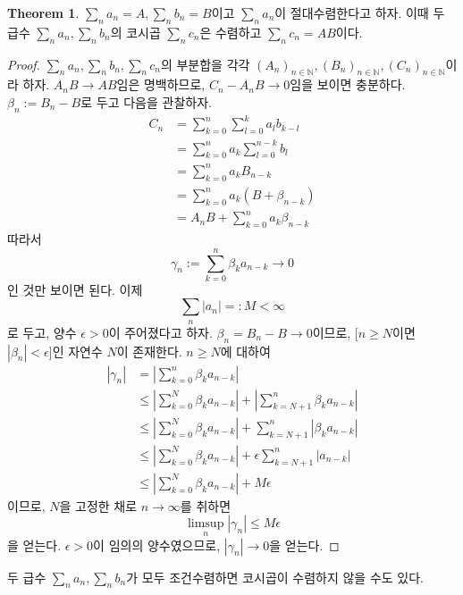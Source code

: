 \documentclass[11pt]{book}
\numberwithin{equation}{chapter}
\def\NN{\mathbb{N}}
\def\eps{\epsilon}
\newcommand{\abs}[1]{\left\vert#1\right\vert}
\theoremstyle{definition}
\newtheorem{thm}{Theorem}[section]
\begin{document}
\begin{thm} \label{5.9.2}
    \(\sum_n a_n = A, \sum_n b_n = B\)이고 \(\sum_n a_n\)이 절대수렴한다고 하자. 이때 두 급수 \(\sum_n a_n, \sum_n b_n\)의 코시곱 \(\sum_n c_n\)은 수렴하고 \(\sum_n c_n = AB\)이다.
\end{thm}
\begin{proof}
    \(\sum_n a_n, \sum_n b_n, \sum_n c_n\)의 부분합을 각각 \((A_n)_{n \in \NN}, (B_n)_{n \in \NN}, (C_n)_{n \in \NN}\)이라 하자. \(A_n B \to AB\)임은 명백하므로, \(C_n - A_n B \to 0\)임을 보이면 충분하다.\\
    \(\beta_n := B_n - B\)로 두고 다음을 관찰하자.
    \begin{align*}
        C_n &= \sum_{k=0}^n \sum_{l=0}^k a_l b_{k-l}\\
        &= \sum_{k=0}^n a_k \sum_{l=0}^{n-k} b_l\\
        &= \sum_{k=0}^n a_k B_{n-k}\\
        &= \sum_{k=0}^n a_k (B + \beta_{n-k})\\
        &= A_n B + \sum_{k=0}^n a_k \beta_{n-k}
    \end{align*}
    따라서
    \[
    \gamma_n := \sum_{k=0}^n \beta_k a_{n-k} \to 0  
    \]
    인 것만 보이면 된다. 이제
    \[
    \sum_n \abs{a_n} =: M < \infty    
    \]
    로 두고, 양수 \(\eps > 0\)이 주어졌다고 하자. \(\beta_n = B_n - B \to 0\)이므로, [\(n \ge N\)이면 \(\abs{\beta_n} < \eps\)]인 자연수 \(N\)이 존재한다. \(n \ge N\)에 대하여
    \begin{align*}
        \abs{\gamma_n} &= \abs{\sum_{k=0}^n \beta_k a_{n-k}}\\
        &\le \abs{\sum_{k=0}^N \beta_k a_{n-k}} + \abs{\sum_{k=N+1}^n \beta_k a_{n-k}}\\
        &\le \abs{\sum_{k=0}^N \beta_k a_{n-k}} + \sum_{k=N+1}^n \abs{\beta_k a_{n-k}}\\
        &\le \abs{\sum_{k=0}^N \beta_k a_{n-k}} + \eps \sum_{k=N+1}^n \abs{a_{n-k}}\\
        &\le \abs{\sum_{k=0}^N \beta_k a_{n-k}} + M\eps
    \end{align*}
    이므로, \(N\)을 고정한 채로 \(n \to \infty\)를 취하면
    \[
    \limsup_n \abs{\gamma_n} \le M\eps    
    \]
    을 얻는다. \(\eps > 0\)이 임의의 양수였으므로, \(\abs{\gamma_n} \to 0\)을 얻는다.
\end{proof}

두 급수 \(\sum_n a_n, \sum_n b_n\)가 모두 조건수렴하면 코시곱이 수렴하지 않을 수도 있다.
\end{document}
